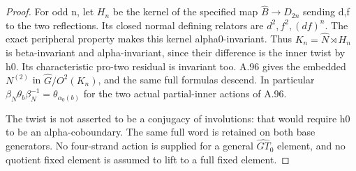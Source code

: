 \begin{proof}
For odd n, let \(H_n\) be the kernel of the specified map
\(\widehat B\to D_{2n}\) sending d,f to the two reflections.
Its closed normal defining relators are \(d^2,f^2,(df)^n\).
The exact peripheral property makes this kernel alpha0-invariant.
Thus \(K_n=\widehat N\rtimes H_n\) is beta-invariant and
alpha-invariant, since their difference is the inner twist by h0.
Its characteristic pro-two residual is invariant too. A.96 gives
the embedded \(N^{(2)}\) in \(\widehat G/O^2(K_n)\), and the
same full formulas descend. In particular
\(\beta_N\theta_b\beta_N^{-1}=\theta_{\alpha_0(b)}\) for the
two actual partial-inner actions of A.96.

The twist is not asserted to be a conjugacy of involutions: that
would require h0 to be an alpha-coboundary. The same full word is
retained on both base generators. No four-strand action is supplied
for a general \(\widehat{GT}_0\) element, and no quotient fixed
element is assumed to lift to a full fixed element.
\end{proof}
